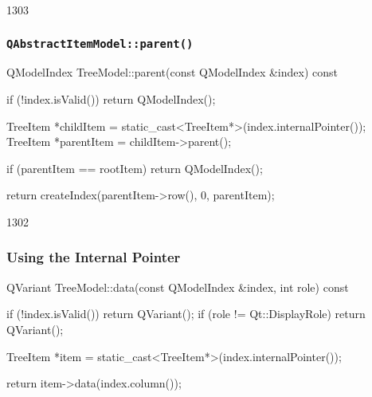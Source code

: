 \begin{slide}[fragile]{1303}
  \frametitle{\textbf{\texttt{QAbstractItemModel::parent()}}}
  \begin{cpp}
QModelIndex TreeModel::parent(const QModelIndex &index) const
{
    if (!index.isValid())
        return QModelIndex();

    TreeItem *childItem = static_cast<TreeItem*>(index.internalPointer());
    TreeItem *parentItem = childItem->parent();

    if (parentItem == rootItem) return QModelIndex();

    return createIndex(parentItem->row(), 0, parentItem);
}
  \end{cpp}
\end{slide}
\begin{slide}[fragile]{1302}\frametitle{Using the Internal Pointer}
  \begin{cpp}
QVariant TreeModel::data(const QModelIndex &index, int role) const
{
    if (!index.isValid()) return QVariant();
    if (role != Qt::DisplayRole) return QVariant();

    TreeItem *item = static_cast<TreeItem*>(index.internalPointer());

    return item->data(index.column());
}
  \end{cpp}
  \medskip
\end{slide}



